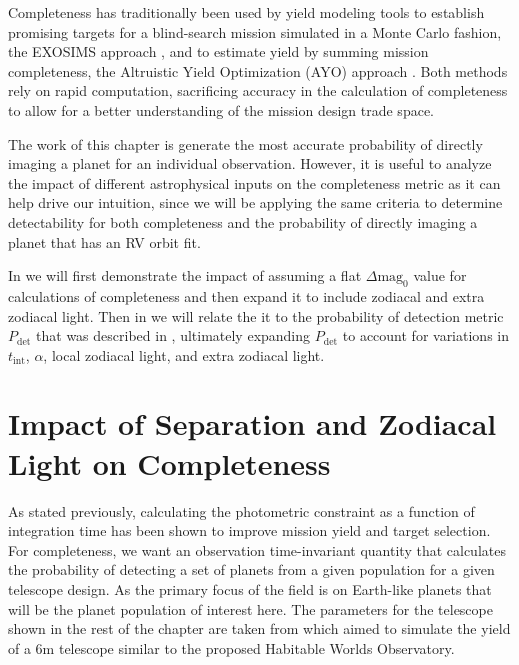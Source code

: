 Completeness has traditionally been used by yield modeling tools to establish
promising targets for a blind-search mission simulated in a Monte Carlo
fashion, the EXOSIMS approach \citep{savranskyEXOSIMSExoplanetOpenSource2017},
and to estimate yield by summing mission completeness, the Altruistic Yield
Optimization (AYO) approach \citep{starkMaximizingExoEarthCandidate2014}. Both
methods rely on rapid computation, sacrificing accuracy in the calculation of
completeness to allow for a better understanding of the mission design trade
space.

The work of this chapter is generate the most accurate probability of directly
imaging a planet for an individual observation. However, it is useful to
analyze the impact of different astrophysical inputs on the completeness metric
as it can help drive our intuition, since we will be applying the same 
criteria to determine detectability for both completeness and the probability
of directly imaging a planet that has an RV orbit fit.

In  we will first demonstrate the impact of
assuming a flat $\Delta\textrm{mag}_0$ value for calculations of completeness
and then expand it to include zodiacal and extra zodiacal light. Then in
 we will relate the it to the probability of
detection metric $P_\textrm{det}$ that was described in ,
ultimately expanding $P_\textrm{det}$ to account for variations in $t_\textrm{int}$, $\alpha$,
local zodiacal light, and extra zodiacal light.


\section{Impact of Separation and Zodiacal Light on Completeness}
\label{sec:impact_on_completeness}

As stated previously, calculating the photometric constraint as a function of
integration time has been shown to improve mission yield and target selection.
For completeness, we want an observation time-invariant quantity that
calculates the probability of detecting a set of planets from a given
population for a given telescope design. As the primary focus of the field is
on Earth-like planets that will be the planet population of interest here. The
parameters for the telescope shown in the rest of the chapter are taken from
\citet{morganExplorationExpectedNumber2022a} which aimed to simulate the yield
of a 6m telescope similar to the proposed Habitable Worlds Observatory.

